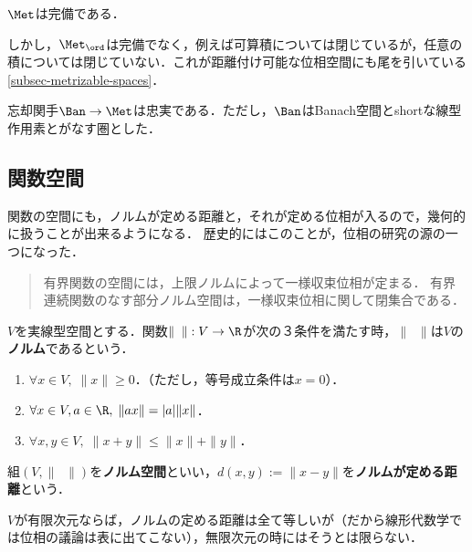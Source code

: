 \documentclass[uplatex,dvipdfmx]{jsreport}
\begin{document}
\begin{proposition}
    $\Met$は完備である．
\end{proposition}
\begin{remark}
    しかし，$\Met_\ord$は完備でなく，例えば可算積については閉じているが，任意の積については閉じていない．これが距離付け可能な位相空間にも尾を引いている\ref{subsec-metrizable-spaces}．
\end{remark}

\begin{proposition}
    忘却関手$\Ban\to\Met$は忠実である．ただし，$\Ban$はBanach空間とshortな線型作用素とがなす圏とした．
\end{proposition}

\subsection{関数空間}

\begin{tcolorbox}[colframe=ForestGreen, colback=ForestGreen!10!white,breakable,colbacktitle=ForestGreen!40!white,coltitle=black,fonttitle=\bfseries\sffamily,
title=]
    関数の空間にも，ノルムが定める距離と，それが定める位相が入るので，幾何的に扱うことが出来るようになる．
    歴史的にはこのことが，位相の研究の源の一つになった．
    \begin{quotation}
        有界関数の空間には，上限ノルムによって一様収束位相が定まる．
        有界連続関数のなす部分ノルム空間は，一様収束位相に関して閉集合である．
    \end{quotation}
\end{tcolorbox}

\begin{definition}
    $V$を実線型空間とする．関数$\|\;\;\|:V\to\R$が次の３条件を満たす時，$\|\;\;\|$は$V$の\textbf{ノルム}であるという．
    \begin{enumerate}
        \item $\forall x\in V,\; \|x\|\ge 0$．（ただし，等号成立条件は$x=0$）．
        \item $\forall x\in V,a\in\R,\; \|ax\|=|a|\|x\|$．
        \item $\forall x,y\in V,\;\|x+y\|\le\|x\|+\|y\|$．
    \end{enumerate}
    組$(V,\|\;\;\|)$を\textbf{ノルム空間}といい，$d(x,y):=\|x-y\|$を\textbf{ノルムが定める距離}という．
\end{definition}
\begin{remark}
    $V$が有限次元ならば，ノルムの定める距離は全て等しいが（だから線形代数学では位相の議論は表に出てこない），無限次元の時にはそうとは限らない．
\end{remark}
\end{document}

